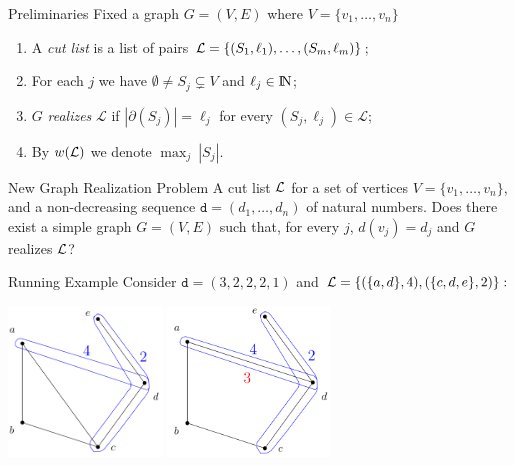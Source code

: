 \begin{frame}{Preliminaries}
    Fixed a graph $G = (V, E)$ where $V = \{v_1, \dots, v_n\}$
    \pause
    \bigbreak
    \begin{enumerate}[-]
        \item A \emph{cut list} is a list of pairs $\mathcal{L} = \{(S_1, \ell_1), \dots, (S_m, \ell_m)\}$;
        
        \item For each $j$ we have $\emptyset \ne S_j \subsetneq V$ and $\ell_j \in \rm I\!N$;
        
        \item $G$ \emph{realizes} $\mathcal{L}$ if $|\partial(S_j)|=\ell_j$ for every $(S_j, \ell_j) \in \mathcal{L}$;

        \item By $w(\mathcal{L})$ we denote $\max_j\ |S_j|$.
    \end{enumerate}
\end{frame}

\begin{frame}{New Graph Realization Problem}
    {A cut list $\mathcal{L}$ for a set of vertices $V = \{v_1, \dots, v_n\}$, and a non-decreasing sequence $\texttt{d} = (d_1, \dots, d_n)$ of natural numbers.}
    {Does there exist a simple graph $G = (V, E)$ such that, for every $j$, $d(v_j) = d_j$ and $G$ realizes $\mathcal{L}$?}
\end{frame}

\begin{frame}{Running Example}
  \centering
  Consider $\texttt{d}=(3, 2, 2, 2, 1)$ and $\mathcal{L} = \{(\{a, d\}, 4), (\{c, d, e\}, 2)\}:$
  \pause
  \bigbreak
  \begin{minipage}{\linewidth}
    \centering
    \includegraphics[height=4cm]{images/cut1.png}
    \pause
    \includegraphics[height=4cm]{images/cut2.png}
  \end{minipage}
\end{frame}

